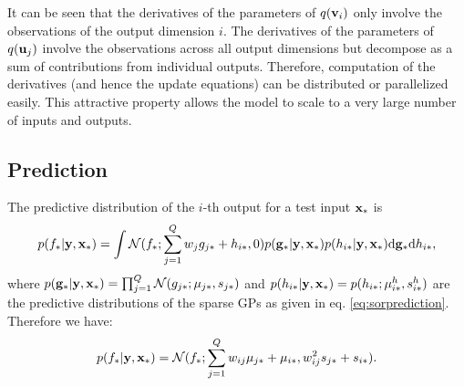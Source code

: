 \noindent It can be seen that the derivatives of the parameters of $q(\mathbf{v}_i)$ only involve the observations of the output dimension $i$.
The derivatives of the parameters of $q(\mathbf{u}_j)$ involve the observations across all output dimensions but decompose as a sum of contributions from individual outputs.
Therefore, computation of the derivatives (and hence the update equations) can be distributed or parallelized easily.
This attractive property allows the model to scale to a very large number of inputs and outputs.


\subsection{Prediction}
The predictive distribution of the $i$-th output for a test input $\mathbf{x}_*$ is 
\begin{align}
p(f_* | \mathbf{y}, \mathbf{x}_*) = \int \mathcal{N}(f_*; \sum_{j=1}^Q w_j g_{j*} + h_{i*}, 0) p(\mathbf{g}_* | \mathbf{y}, \mathbf{x}_*) p(h_{i*} | \mathbf{y}, \mathbf{x}_*) \mathrm{d} \mathbf{g}_* \mathrm{d} h_{i*},
\end{align}
where $p(\mathbf{g}_* | \mathbf{y}, \mathbf{x}_*) = \prod_{j=1}^Q \mathcal{N}(g_{j*}; \mu_{j*}, s_{j*})$ and $p(h_{i*} | \mathbf{y}, \mathbf{x}_*) = p(h_{i*}; \mu^h_{i*}, s^h_{i*})$ are the predictive distributions of the sparse GPs as given in eq. \ref{eq:sorprediction}.
Therefore we have:
\begin{align}
p(f_* | \mathbf{y}, \mathbf{x}_*) = \mathcal{N}(f_*; \sum_{j=1}^Q w_{ij} \mu_{j*} + \mu_{i*}, w_{ij}^2 s_{j*} + s_{i*}). 
\end{align}


